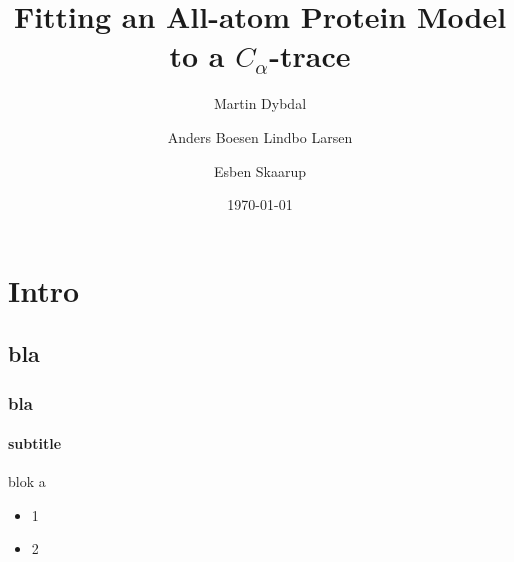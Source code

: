 \documentclass{beamer}
\title{Fitting an All-atom Protein Model to a $C_{\alpha}$-trace}
\subtitle{}
\author{Martin Dybdal \and Anders Boesen Lindbo Larsen \and Esben Skaarup}
\institute{\textrm{Datalogisk Institut, Københavns Universitet}}
\date{\today}
\begin{document}
\frame{\titlepage}

\section{Intro}
\subsection{bla}
\begin{frame}[t, fragile]
  \frametitle{bla} 
  \framesubtitle{subtitle}

  \begin{block}{blok}
    a
  \end{block}

  \pause

  \begin{itemize}
    \item 1
    \item 2
  \end{itemize}

\end{frame}



\end{document}
